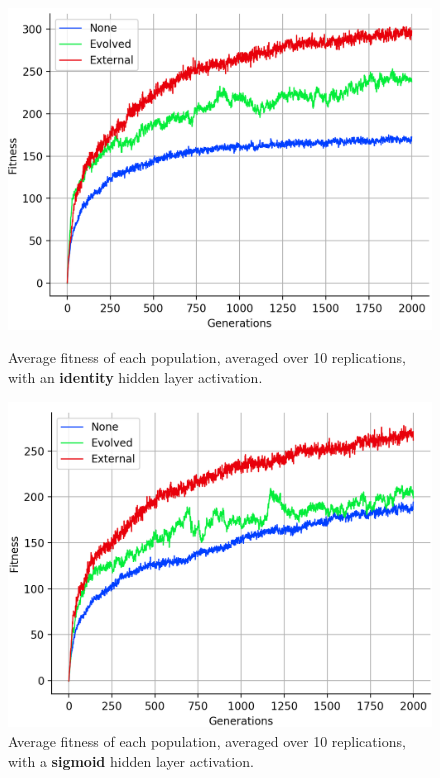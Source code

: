 \documentclass[12pt,a4paper]{report}
\begin{document}
\begin{figure}[t]
   \centering
   \begin{minipage}{0.5\textwidth}
          \centering
          \captionsetup{width=.9\linewidth}
          \includegraphics[width=1.\linewidth]{results/average-identity.png}
          \caption{Average fitness of each population, averaged over 10 replications, with an {\bf identity} hidden layer activation.}
          \label{fig:average-identity}
   \end{minipage}
   \begin{minipage}{0.5\textwidth}
          \centering
          \captionsetup{width=.9\linewidth}
          \includegraphics[width=1.\linewidth]{results/average-sigmoid.png}
          \caption{Average fitness of each population, averaged over 10 replications, with a {\bf sigmoid} hidden layer activation.}
          \label{fig:average-sigmoid}
   \end{minipage}
\end{figure}
\end{document}
